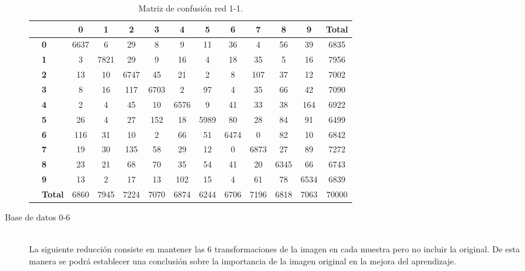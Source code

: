 \begin{description}
\begin{table}[H]
\begin{tabular}{|c|l|c|c|c|c|c|c|c|c|c|c|c|}
			\multicolumn{2}{c|}{} & \textbf{0} & \textbf{1} & \textbf{2} &  \textbf{3} & \textbf{4} & \textbf{5} & \textbf{6} & \textbf{7} & \textbf{8} & \textbf{9} & \textbf{Total}\\ \hline
			\multirow{10}{0.5cm}{\rotatebox{90}{\textbf{Predicción}}}& \textbf{0} & \cellcolor{lightgray}6637 & 6 & 29 & 8 & 9 & 11 & 36 & 4 & 56 & 39 & 6835\\ \cline{2-13}
			& \textbf{1} & 3 & \cellcolor{lightgray}7821 & 29 & 9 & 16 & 4 & 18 & 35 & 5 & 16 & 7956\\ \cline{2-13}
			& \textbf{2} & 13 & 10 & \cellcolor{lightgray}6747 & 45 & 21 & 2 & 8 & 107 & 37 & 12 & 7002\\ \cline{2-13}
			& \textbf{3} & 8 & 16 & 117 & \cellcolor{lightgray}6703 & 2 & 97 & 4 & 35 & 66 & 42 & 7090\\ \cline{2-13}
			& \textbf{4} & 2 & 4 & 45 & 10 & \cellcolor{lightgray}6576 & 9 & 41 & 33 & 38 & 164 & 6922\\ \cline{2-13}
			& \textbf{5} & 26 & 4 & 27 & 152 & 18 & \cellcolor{lightgray}5989 & 80 & 28 & 84 & 91 & 6499\\ \cline{2-13}
			& \textbf{6} & 116 & 31 & 10 & 2 & 66 & 51 & \cellcolor{lightgray}6474 & 0 & 82 & 10 & 6842\\ \cline{2-13}
			& \textbf{7} & 19 & 30 & 135 & 58 & 29 & 12 & 0 & \cellcolor{lightgray}6873 & 27 & 89 & 7272\\ \cline{2-13}
			& \textbf{8} & 23 & 21 & 68 & 70 & 35 & 54 & 41 & 20 & \cellcolor{lightgray}6345 & 66 & 6743\\ \cline{2-13}
			& \textbf{9} & 13 & 2 & 17 & 13 & 102 & 15 & 4 & 61 & 78 & \cellcolor{lightgray}6534 & 6839\\ \cline{2-13}
			& \textbf{Total} & 6860 & 7945 & 7224 & 7070 & 6874 & 6244 & 6706 & 7196 & 6818 & 7063 & 70000\\ \hline
		\end{tabular}
		\caption{Matriz de confusión red 1-1.}
		\label{tab.matriz1-1}
	\end{table}
	\item[Base de datos 0-6] \hfill 
	\vspace{10pt}
	\\
	La siguiente reducción consiste en mantener las 6 transformaciones de la imagen en cada muestra pero no incluir la original. De esta manera se podrá establecer una conclusión sobre la importancia de la imagen original en la mejora del aprendizaje.\\
	\vspace{-10pt}

\end{description}
